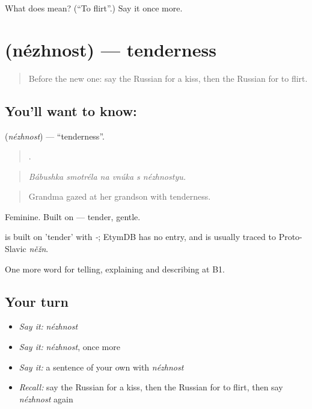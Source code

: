 \begin{tcolorbox}[breakable,colback=teal!4,colframe=teal!35!black,title={Before you move on}]
What does  mean? (\textquotedblleft{}To flirt\textquotedblright{}.) Say it once more.
\end{tcolorbox}
\section[\texorpdfstring{\ru{нежность} (nézhnost)}{нежность (nézhnost)}]{ (nézhnost) — tenderness}

\label{lesson:RU-C493-nezhnost}



\begin{quote}
Before the new one: say the Russian for a kiss, then the Russian for to flirt.
\end{quote}

\subsection*{You'll want to know: }
\textbf{} (\emph{nézhnost}) — \textquotedblleft{}tenderness\textquotedblright{}.

\begin{quote}
     .
\end{quote}

\begin{quote}
\emph{Bábushka smotréla na vnúka s nézhnostyu.}
\end{quote}

\begin{quote}
Grandma gazed at her grandson with tenderness.
\end{quote}

Feminine. Built on \emph{} — tender, gentle.

\begin{cousinweb}
\emph{} is built on \emph{} 'tender' with \emph{-}; EtymDB has no entry, and \emph{} is usually traced to Proto-Slavic \emph{něžn}.
\end{cousinweb}

\begin{grammarlens}[title={What you've built}]
One more word for telling, explaining and describing at B1.
\end{grammarlens}

\subsection*{Your turn}
\begin{itemize}
\raggedright
  \item \emph{Say it:} \emph{nézhnost}
  \item \emph{Say it:} \emph{nézhnost}, once more
  \item \emph{Say it:} a sentence of your own with \emph{nézhnost}
  \item \emph{Recall:} say the Russian for a kiss, then the Russian for to flirt, then say \emph{nézhnost} again
\end{itemize}

